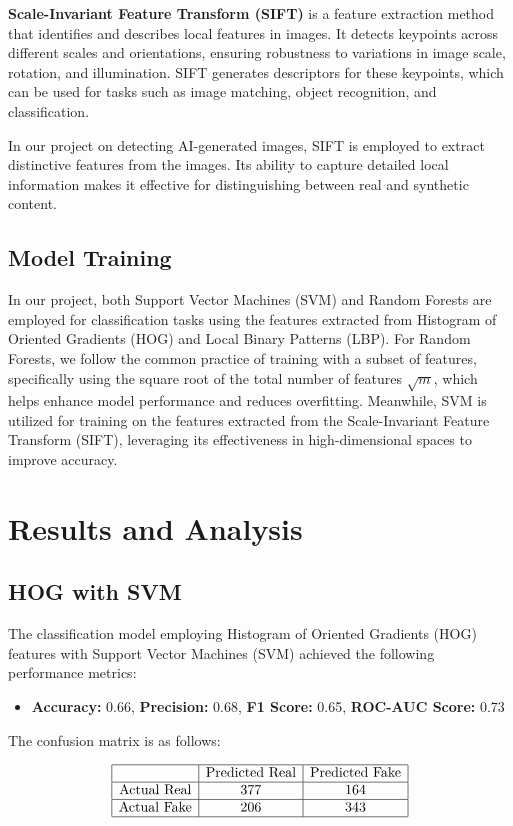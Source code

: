 \documentclass[10pt,twocolumn,letterpaper]{article}
\begin{document}
\textbf{Scale-Invariant Feature Transform (SIFT)} is a feature extraction method that identifies and describes local features in images. It detects keypoints across different scales and orientations, ensuring robustness to variations in image scale, rotation, and illumination. SIFT generates descriptors for these keypoints, which can be used for tasks such as image matching, object recognition, and classification.

In our project on detecting AI-generated images, SIFT is employed to extract distinctive features from the images. Its ability to capture detailed local information makes it effective for distinguishing between real and synthetic content.
\subsection{Model Training}
In our project, both Support Vector Machines (SVM) and Random Forests are employed for classification tasks using the features extracted from Histogram of Oriented Gradients (HOG) and Local Binary Patterns (LBP). For Random Forests, we follow the common practice of training with a subset of features, specifically using the square root of the total number of features \( \sqrt{m} \), which helps enhance model performance and reduces overfitting. Meanwhile, SVM is utilized for training on the features extracted from the Scale-Invariant Feature Transform (SIFT), leveraging its effectiveness in high-dimensional spaces to improve accuracy.

\section{Results and Analysis}
\subsection{HOG with SVM}

The classification model employing Histogram of Oriented Gradients (HOG) features with Support Vector Machines (SVM) achieved the following performance metrics:

\begin{itemize}
    \item \textbf{Accuracy:} 0.66, \textbf{Precision:} 0.68, \textbf{F1 Score:} 0.65, \textbf{ROC-AUC Score:} 0.73
\end{itemize}


The confusion matrix is as follows:

\[
\begin{array}{|c|c|c|}
\hline
& \text{Predicted Real} & \text{Predicted Fake} \\
\hline
\text{Actual Real} & 377 & 164 \\
\hline
\text{Actual Fake} & 206 & 343 \\
\hline
\end{array}
\]
\end{document}
